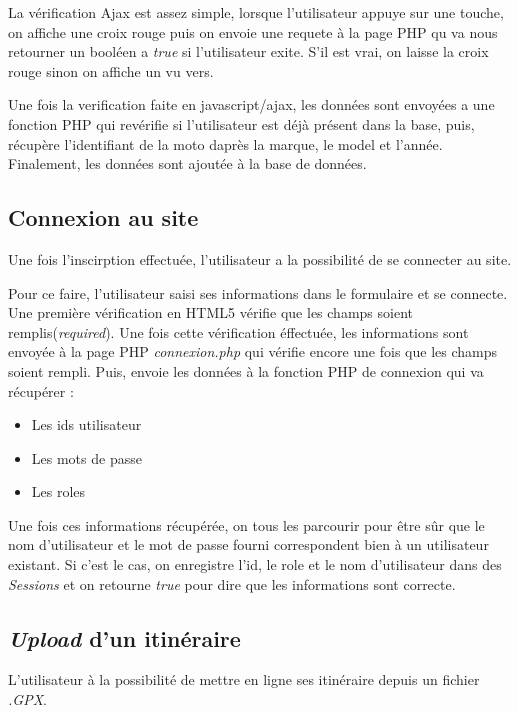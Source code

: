 \documentclass[a4paper]{article}
\newcommand{\diag}[1]{}
\begin{document}
La vérification Ajax est assez simple, lorsque l'utilisateur appuye sur une touche, on affiche une croix rouge puis on envoie une requete à la page PHP qu va nous retourner un booléen a \emph{true} si l'utilisateur exite. S'il est vrai, on laisse la croix rouge sinon on affiche un vu vers.

Une fois la verification faite en javascript/ajax, les données sont envoyées a une fonction PHP qui revérifie si l'utilisateur est déjà présent dans la base, puis, récupère l'identifiant de la moto daprès la marque, le model et l'année.
Finalement, les données sont ajoutée à la base de données.
\begin{center}
	 \diag{Inscription}
\end{center}




\subsection{Connexion au site}
Une fois l'inscirption effectuée, l'utilisateur a la possibilité de se connecter au site.

Pour ce faire, l'utilisateur saisi ses informations dans le formulaire et se connecte.
Une première vérification en HTML5 vérifie que les champs soient remplis(\emph{required}).
Une fois cette vérification éffectuée, les informations sont envoyée à la page PHP \emph{connexion.php} qui vérifie encore une fois que les champs soient rempli. Puis, envoie les données à la fonction PHP de connexion qui va récupérer :
\begin{itemize}
	\item Les ids utilisateur
	\item Les mots de passe
	\item Les roles
\end{itemize}

Une fois ces informations récupérée, on tous les parcourir pour être sûr que le nom d'utilisateur et le mot de passe fourni correspondent bien à un utilisateur existant.
Si c'est le cas, on enregistre l'id, le role et le nom d'utilisateur dans des \emph{Sessions} et on retourne \emph{true} pour dire que les informations sont correcte.

\begin{center}
	\diag{Connexion}
\end{center}

\subsection{\emph{Upload} d'un itinéraire}
L'utilisateur à la possibilité de mettre en ligne ses itinéraire depuis un fichier \emph{.GPX}.
\end{document}

